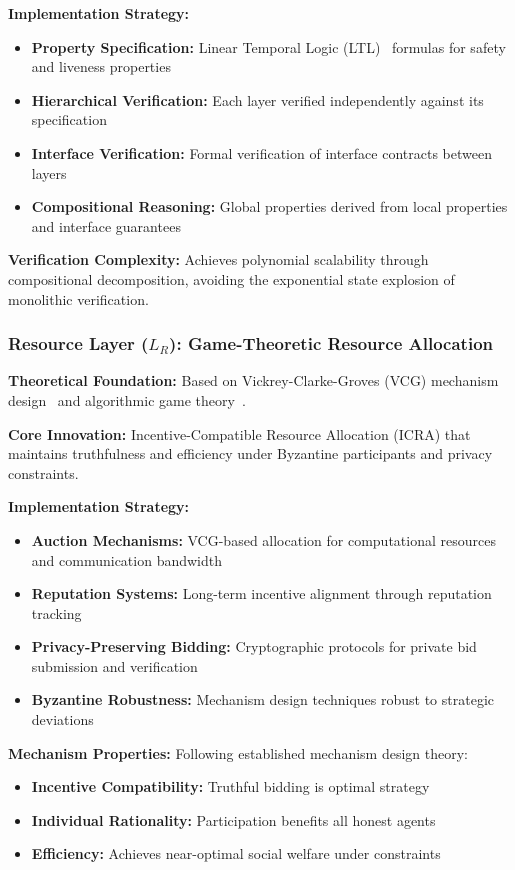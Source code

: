 \documentclass[conference]{IEEEtran}
\begin{document}
\textbf{Implementation Strategy:}
\begin{itemize}
    \item \textbf{Property Specification:} Linear Temporal Logic (LTL)~\cite{pnueli1977temporal} formulas for safety and liveness properties
    \item \textbf{Hierarchical Verification:} Each layer verified independently against its specification
    \item \textbf{Interface Verification:} Formal verification of interface contracts between layers
    \item \textbf{Compositional Reasoning:} Global properties derived from local properties and interface guarantees
\end{itemize}

\textbf{Verification Complexity:} Achieves polynomial scalability through compositional decomposition, avoiding the exponential state explosion of monolithic verification.

\subsubsection{Resource Layer ($L_R$): Game-Theoretic Resource Allocation}

\textbf{Theoretical Foundation:} Based on Vickrey-Clarke-Groves (VCG) mechanism design~\cite{vickrey1961counterspeculation} and algorithmic game theory~\cite{myerson1991game}.

\textbf{Core Innovation:} Incentive-Compatible Resource Allocation (ICRA) that maintains truthfulness and efficiency under Byzantine participants and privacy constraints.

\textbf{Implementation Strategy:}
\begin{itemize}
    \item \textbf{Auction Mechanisms:} VCG-based allocation for computational resources and communication bandwidth  
    \item \textbf{Reputation Systems:} Long-term incentive alignment through reputation tracking
    \item \textbf{Privacy-Preserving Bidding:} Cryptographic protocols for private bid submission and verification
    \item \textbf{Byzantine Robustness:} Mechanism design techniques robust to strategic deviations
\end{itemize}

\textbf{Mechanism Properties:} Following established mechanism design theory:
\begin{itemize}
    \item \textbf{Incentive Compatibility:} Truthful bidding is optimal strategy
    \item \textbf{Individual Rationality:} Participation benefits all honest agents
    \item \textbf{Efficiency:} Achieves near-optimal social welfare under constraints
\end{itemize}
\end{document}
